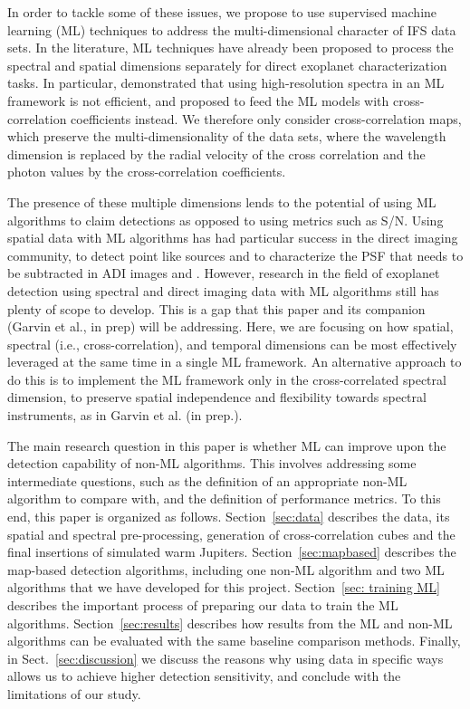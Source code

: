 \documentclass{aa}
\begin{document}
In order to tackle some of these issues, we propose to use supervised machine learning (ML) techniques to address the multi-dimensional character of IFS data sets. In the literature, ML techniques have already been proposed to process the spectral and spatial dimensions separately for direct exoplanet characterization tasks. In particular, \citet{2020Fisher} demonstrated that using high-resolution spectra in an ML framework is not efficient, and proposed to feed the ML models with cross-correlation coefficients instead. 
We therefore only consider cross-correlation maps, which preserve the multi-dimensionality of the data sets, where the wavelength dimension is replaced by the radial velocity of the cross correlation and the photon values by the cross-correlation coefficients. 

The presence of these multiple dimensions lends to the potential of using ML algorithms to claim detections as opposed to using metrics such as S/N.
Using spatial data with ML algorithms has had particular success in the direct imaging community, to detect point like sources \cite{2018Gomez} and \cite{2023Carlito} to characterize the PSF that needs to be subtracted in ADI images \cite{2022Gebhard} and \cite{2023Flasseur}.
However, research in the field of exoplanet detection using spectral and direct imaging data with ML algorithms still has plenty of scope to develop. This is a gap that this paper and its companion (Garvin et al., in prep) will be addressing.
Here, we are focusing on how spatial, spectral (i.e., cross-correlation), and temporal dimensions can be most effectively leveraged at the same time in a single ML framework. 
An alternative approach to do this is to implement the ML framework only in the cross-correlated spectral dimension, to preserve spatial independence and flexibility towards spectral instruments, as in Garvin et al. (in prep.).

The main research question in this paper is whether ML can improve upon the detection capability of non-ML algorithms. This involves addressing some intermediate questions, such as the definition of an appropriate non-ML algorithm to compare with, and the definition of performance metrics.
To this end, this paper is organized as follows. Section~\ref{sec:data} describes the data, its spatial and spectral pre-processing, generation of cross-correlation cubes and the final insertions of simulated warm Jupiters.
Section~\ref{sec:mapbased} describes the map-based detection algorithms, including one non-ML algorithm and two ML algorithms that we have developed for this project.
Section~\ref{sec: training ML} describes the important process of preparing our data to train the ML algorithms.
Section~\ref{sec:results} describes how results from the ML and non-ML algorithms can be evaluated with the same baseline comparison methods.
Finally, in Sect.~\ref{sec:discussion} we discuss the reasons why using data in specific ways allows us to achieve higher detection sensitivity, and conclude with the limitations of our study.
\end{document}
